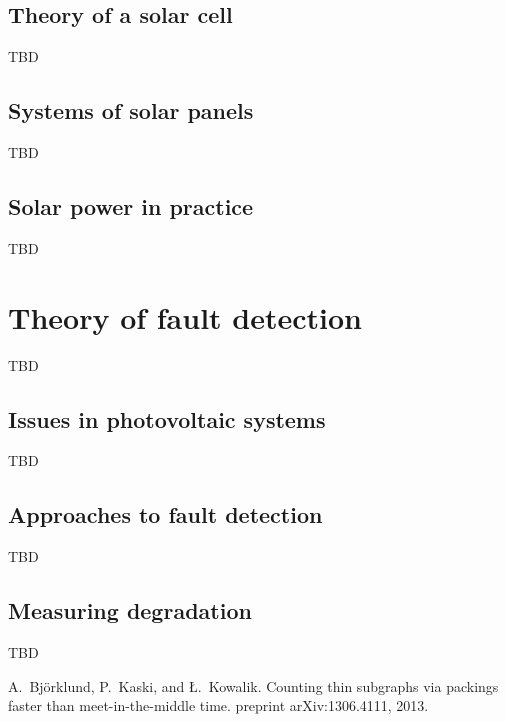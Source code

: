 \documentclass[a4paper,11pt]{report}
\begin{document}
\section{Theory of a solar cell}
TBD

\section{Systems of solar panels}
TBD

\section{Solar power in practice}
TBD

\chapter{Theory of fault detection}
TBD

\section{Issues in photovoltaic systems}
TBD

\section{Approaches to fault detection}
TBD

\section{Measuring degradation}
TBD

\begin{thebibliography}{10}

A.~{Bj{\"o}rklund}, P.~Kaski, and {\L}.~Kowalik.
\newblock Counting thin subgraphs via packings faster than meet-in-the-middle time.
 preprint arXiv:1306.4111, 2013.

\end{thebibliography}
\end{document}
